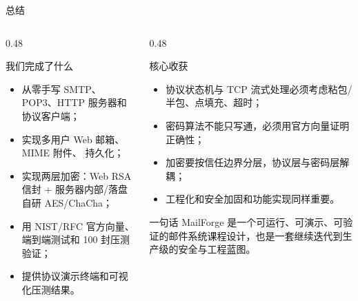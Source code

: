 \documentclass[aspectratio=169,10pt]{beamer}
\newcommand{\code}[1]{\texttt{\small\detokenize{#1}}}
\begin{document}
\begin{frame}{总结}
  \begin{columns}[T]
    \begin{column}{0.48\textwidth}
      \begin{block}{我们完成了什么}
        \small
        \begin{itemize}
          \item 从零手写 SMTP、POP3、HTTP 服务器和协议客户端；
          \item 实现多用户 Web 邮箱、MIME 附件、\code{.eml} 持久化；
          \item 实现两层加密：Web RSA 信封 + 服务器内部/落盘自研 AES/ChaCha；
          \item 用 NIST/RFC 官方向量、端到端测试和 100 封压测验证；
          \item 提供协议演示终端和可视化压测结果。
        \end{itemize}
      \end{block}
    \end{column}
    \begin{column}{0.48\textwidth}
      \begin{block}{核心收获}
        \small
        \begin{itemize}
          \item 协议状态机与 TCP 流式处理必须考虑粘包/半包、点填充、超时；
          \item 密码算法不能只写通，必须用官方向量证明正确性；
          \item 加密要按信任边界分层，协议层与密码层解耦；
          \item 工程化和安全加固和功能实现同样重要。
        \end{itemize}
      \end{block}
      \begin{block}{一句话}
        \centering
        MailForge 是一个可运行、可演示、可验证的邮件系统课程设计，也是一套继续迭代到生产级的安全与工程蓝图。
      \end{block}
    \end{column}
  \end{columns}
\end{frame}
\end{document}
